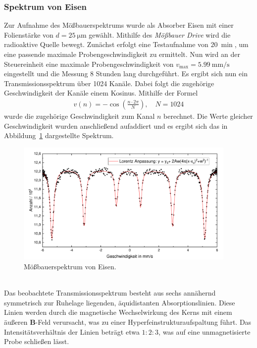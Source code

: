 \documentclass[a4paper,twoside,final]{article}
\begin{document}
\subsubsection{Spektrum von Eisen}
Zur Aufnahme des Mößbauerspektrums wurde als Absorber Eisen mit einer Folienstärke von $d = \SI{25}{\micro\metre}$ gewählt. Mithilfe des \textit{Mößbauer Drive} wird die radioaktive Quelle bewegt. Zunächst erfolgt eine Testaufnahme von $\SI{20}{\min}$, um eine passende maximale Probengeschwindigkeit zu ermittelt. Nun wird an der Steuereinheit eine maximale Probengeschwindigkeit von $v_\text{max} = \SI{5,99}{\milli\metre\per\second}$ eingestellt und die Messung 8 Stunden lang durchgeführt. Es ergibt sich nun ein Transmissionsspektrum über 1024 Kanäle. Dabei folgt die zugehörige Geschwindigkeit der Kanäle einem Kosinus. Mithilfe der Formel
\begin{align}
  v(n) = -\cos\left(\frac{n\cdot2\pi}{N}\right), \quad N = 1024
\end{align}
wurde die zugehörige Geschwindigkeit zum Kanal $n$ berechnet. Die Werte gleicher Geschwindigkeit wurden anschließend aufaddiert und es ergibt sich das in Abbildung~\ref{fig:Spektrum_Eisen} dargestellte Spektrum.
\begin{figure}[htp]
    \centering
    \includegraphics[width=0.95\textwidth]{Bilder/Moessbauer_Fe25_Lorentz.pdf}
    \caption{Mößbauerspektrum von Eisen.}
    \label{fig:Spektrum_Eisen}
\end{figure}\\
Das beobachtete Transmissionsspektrum besteht aus sechs annähernd symmetrisch zur Ruhelage liegenden, äquidistanten Absorptionslinien. Diese Linien werden durch die magnetische Wechselwirkung des Kerns mit einem äußeren $\bm{B}$-Feld verursacht, was zu einer Hyperfeinstrukturaufspaltung führt. Das Intensitätsverhältnis der Linien beträgt etwa $1:2:3$, was auf eine unmagnetisierte Probe schließen lässt.
\end{document}
